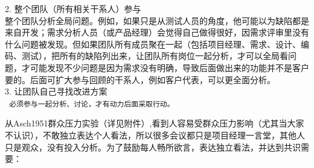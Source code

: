 2. 整个团队（所有相关干系人）参与\\
整个团队分析全局问题。例如，如果只是从测试人员的角度，他可能以为缺陷都是来自开发；需求分析人员（或产品经理）会觉得自己做得很好，因需求评审里没有什么问题被发现。但如果团队所有成员聚在一起（包括项目经理、需求、设计、编码、测试），把所有的缺陷列出来，让团队所有岗位一起分析，才可以全局看问题，才可能发现不少问题是因为需求没有明确，导致后面做出来的功能并不是客户要的。后面可扩大参与回顾的干系人，例如客户代表，可以更全面分析。\\
3. 让团队自己寻找改进方案 \\

\texttt{~必须参与一起分析、讨论，才有动力后面采取行动。}


从Asch1951群众压力实验（详见附件）,看到人容易受群众压力影响（尤其当大家不认识），不敢独立表达个人看法，所以很多会议都只是项目经理一言堂，其他人只是观众，没有投入分析。为了鼓励每人畅所欲言，表达独立看法，并达到共识需要：

